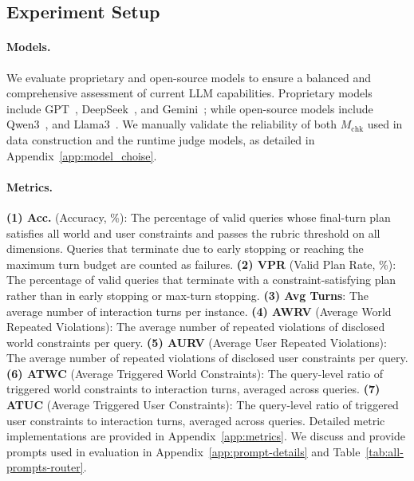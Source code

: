 \documentclass{llmxive}
\providecommand{\bx}[1]{{{$^\textbf{bingxuan}$[#1]}}}
\begin{document}
\subsection{Experiment Setup}
\label{sec:experiment-setup}

\paragraph{Models.}
We evaluate proprietary and open-source models to ensure a balanced and comprehensive assessment of current LLM capabilities. 
Proprietary models include GPT~\citep{gpt}, DeepSeek~\citep{deepseek2026v4preview}, and Gemini~\citep{gemini31pro}; while open-source models include Qwen3~\citep{qwen3technicalreport}, and Llama3~\citep{grattafiori2024llama3herdmodels}. 
We manually validate the reliability of both $M_{\mathrm{chk}}$ used in data construction and the runtime judge models, as detailed in Appendix~\ref{app:model_choise}.


\paragraph{Metrics.}
\textbf{(1) Acc.} (Accuracy, \%):
The percentage of valid queries whose final-turn plan satisfies all world and user constraints and passes the rubric threshold on all dimensions. 
Queries that terminate due to early stopping or reaching the maximum turn budget are counted as failures.
\textbf{(2) VPR} (Valid Plan Rate, \%):
The percentage of valid queries that terminate with a constraint-satisfying plan rather than in early stopping or max-turn stopping.
\textbf{(3) Avg Turns}:
The average number of interaction turns per instance.
\textbf{(4) AWRV} (Average World Repeated Violations):
The average number of repeated violations of disclosed world constraints per query.
\textbf{(5) AURV} (Average User Repeated Violations):
The average number of repeated violations of disclosed user constraints per query.
\textbf{(6) ATWC} (Average Triggered World Constraints):
The query-level ratio of triggered world constraints to interaction turns, averaged across queries.
\textbf{(7) ATUC} (Average Triggered User Constraints):
The query-level ratio of triggered user constraints to interaction turns, averaged across queries.
Detailed metric implementations are provided in Appendix~\ref{app:metrics}.
We discuss and provide prompts used in evaluation in Appendix~\ref{app:prompt-details} and Table~\ref{tab:all-prompts-router}. 
\end{document}
